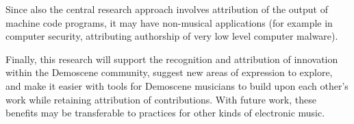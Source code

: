 \documentclass[10pt]{article}
\begin{document}
\begin{multicols*}{2}
Since also the central research approach involves attribution of the output of machine code programs, it may have non-musical applications (for example in computer security, attributing authorship of very low level computer malware).

Finally, this research will support the recognition and attribution of innovation within the Demoscene community, suggest new areas of expression to explore, and make it easier with tools for Demoscene musicians to build upon each other’s work while retaining attribution of contributions. With future work, these benefits may be transferable to practices for other kinds of electronic music.




\end{multicols*}

\nocite{*}


\end{document}
